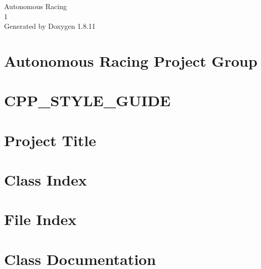 \documentclass[twoside]{book}
\newcommand{\+}{\discretionary{\mbox{\scriptsize$\hookleftarrow$}}{}{}}
\newcommand{\clearemptydoublepage}{%
  \newpage{\pagestyle{empty}\cleardoublepage}%
}
\begin{document}
\hypersetup{pageanchor=false,
             bookmarksnumbered=true,
             pdfencoding=unicode
            }
\begin{titlepage}
\vspace*{7cm}
\begin{center}%
{\Large Autonomous Racing \\[1ex]\large 1 }\\
\vspace*{1cm}
{\large Generated by Doxygen 1.8.11}\\
\end{center}
\end{titlepage}
\clearemptydoublepage
\tableofcontents
\clearemptydoublepage
{}
\hypersetup{pageanchor=true}

\chapter{Autonomous Racing Project Group}
\label{index}\hypertarget{index}{}
\chapter{C\+P\+P\+\_\+\+S\+T\+Y\+L\+E\+\_\+\+G\+U\+I\+DE}
\label{md__home_travis_build_Autonomous-Racing-PG_ros.package_docs_master_CPP_STYLE_GUIDE}
\hypertarget{md__home_travis_build_Autonomous-Racing-PG_ros.package_docs_master_CPP_STYLE_GUIDE}{}

\chapter{Project Title}
\label{md__home_travis_build_Autonomous-Racing-PG_ros.package_docs_master_README}
\hypertarget{md__home_travis_build_Autonomous-Racing-PG_ros.package_docs_master_README}{}

\chapter{Class Index}

\chapter{File Index}

\chapter{Class Documentation}







\end{document}
